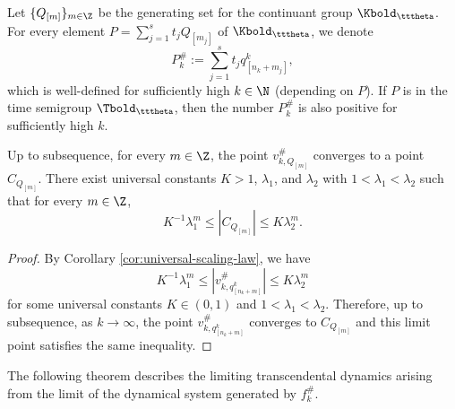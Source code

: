 \documentclass{amsart}
\begin{document}
Let $\{Q_{[m]}\}_{m \in \Z}$ be the generating set for the continuant group $\Kbold_{\tttheta}$.
For every element $P = \sum_{j=1}^s t_j Q_{[m_j]}$ of $\Kbold_{\tttheta}$, we denote
\[
    P_k^{\#} := \sum_{j=1}^s t_j q^k_{[n_k+m_j]},
\]
which is well-defined for sufficiently high $k \in \N$ (depending on $P$).
If $P$ is in the time semigroup $\Tbold_{\tttheta}$, then the number $P_k^{\#}$ is also positive for sufficiently high $k$.

\begin{lemma}
\label{lem:scaling-critical-value}
    Up to subsequence, for every $ m \in \Z $, the point $v^{\#}_{k, Q_{[m]}}$ converges to a point $C_{Q_{[m]}}$.
    There exist universal constants $K >1$, $\lambda_1$, and $\lambda_2$ with $1<\lambda_1<\lambda_2$ such that for every $m \in \Z$,
    \[
        K^{-1} \lambda_1^m \leq | C_{Q_{[m]}}| \leq K \lambda_2^m.
    \]
\end{lemma}

\begin{proof}
    By Corollary \ref{cor:universal-scaling-law}, we have 
    \[
    K^{-1} \lambda_1^m \leq \left| v^{\#}_{k,q^k_{[n_k+m]}} \right| \leq K \lambda_2^m
    \]
    for some universal constants $K \in (0,1)$ and $1 < \lambda_1 < \lambda_2$.
    Therefore, up to subsequence, as $k \to \infty$, the point $v^{\#}_{k,q^k_{[n_k+m]}}$ converges to $C_{Q_{[m]}}$ and this limit point satisfies the same inequality.
\end{proof}

The following theorem describes the limiting transcendental dynamics arising from the limit of the dynamical system generated by $f_k^{\#}$.
\end{document}
